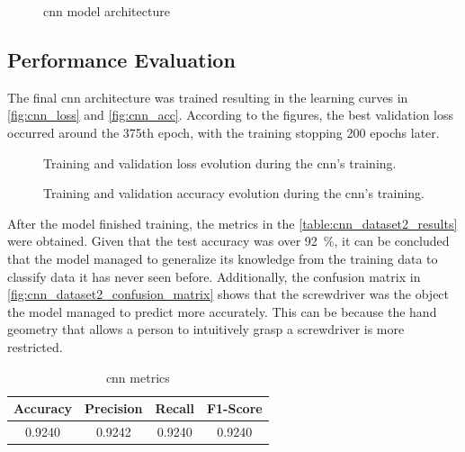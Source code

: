 \begin{figure}[ht]
    \centering
    {\fontsize{10}{12}\selectfont}
    \caption{\acs{cnn} model architecture}
    \label{fig:cnn_architecture}
\end{figure}

\subsection{Performance Evaluation}

The final \acs{cnn} architecture was trained resulting in the learning curves in \autoref{fig:cnn_loss} and \autoref{fig:cnn_acc}. According to the figures, the best validation loss occurred around the 375th epoch, with the training stopping 200 epochs later.

\begin{figure}[ht]
    \centering
    {\fontsize{9.5}{12}\selectfont}
    \caption{Training and validation loss evolution during the \acs{cnn}'s training.}
    \label{fig:cnn_loss}
\end{figure}

\begin{figure}[ht]
    \centering
    {\fontsize{9.5}{12}\selectfont}
    \caption{Training and validation accuracy evolution during the \acs{cnn}'s training.}
    \label{fig:cnn_acc}
\end{figure}

After the model finished training, the metrics in the \autoref{table:cnn_dataset2_results} were obtained. Given that the test accuracy was over \SI{92}{\percent}, it can be concluded that the model managed to generalize its knowledge from the training data to classify data it has never seen before. Additionally, the confusion matrix in \autoref{fig:cnn_dataset2_confusion_matrix} shows that the screwdriver was the object the model managed to predict more accurately. This can be because the hand geometry that allows a person to intuitively grasp a screwdriver is more restricted.

\begin{table}[ht]
    \centering
    \caption{\acs{cnn} metrics}
    \label{table:cnn_dataset2_results}
    \begin{tabular}{cccc}
        \toprule
        Accuracy & Precision & Recall & F1-Score \\
        \midrule
        0.9240 & 0.9242 & 0.9240 & 0.9240 \\
        \bottomrule
    \end{tabular}
\end{table}

